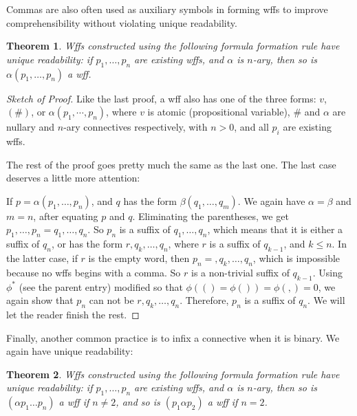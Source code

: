 \documentclass[12pt]{article}
\newtheorem{thm}{Theorem}
\begin{document}
Commas are also often used as auxiliary symbols in forming wffs to improve comprehensibility without violating unique readability.

\begin{thm}  Wffs constructed using the following formula formation rule have unique readability: if $p_1, \ldots, p_n$ are existing wffs, and $\alpha$ is $n$-ary, then so is $\alpha(p_1, \ldots, p_n)$ a wff. \end{thm}

\begin{proof}[Sketch of Proof]  Like the last proof, a wff also has one of the three forms: $v$, $(\#)$, or $\alpha( p_1, \cdots, p_n)$, where $v$ is atomic (propositional variable), $\#$ and $\alpha$ are nullary and $n$-ary connectives respectively, with $n>0$, and all $p_i$ are existing wffs.  

The rest of the proof goes pretty much the same as the last one.  The last case deserves a little more attention:

If $p=\alpha (p_1, \ldots, p_n)$, and $q$ has the form $\beta (q_1, \ldots, q_m)$.  We again have $\alpha = \beta$ and $m=n$, after equating $p$ and $q$.  Eliminating the parentheses, we get $p_1, \ldots, p_n = q_1, \ldots, q_n$.  So $p_n$ is a suffix of $q_1, \ldots, q_n$, which means that it is either a suffix of $q_n$, or has the form $r,q_k,\ldots, q_n$, where $r$ is a suffix of $q_{k-1}$, and $k\le n$.  In the latter case, if $r$ is the empty word, then $p_n = ,q_k,\ldots, q_n$, which is impossible because no wffs begins with a comma.  So $r$ is a non-trivial suffix of $q_{k-1}$.  Using $\phi^*$ (see the parent entry) modified so that $\phi(()=\phi())=\phi(,)=0$, we again show that $p_n$ can not be $r, q_k,\ldots, q_n$.  Therefore, $p_n$ is a suffix of $q_n$.  We will let the reader finish the rest.
\end{proof}

Finally, another common practice is to infix a connective when it is binary.  We again have unique readability:

\begin{thm}  Wffs constructed using the following formula formation rule have unique readability: if $p_1, \ldots, p_n$ are existing wffs, and $\alpha$ is $n$-ary, then so is $(\alpha p_1 \ldots p_n)$ a wff if $n\ne 2$, and so is $(p_1 \alpha p_2)$ a wff if $n=2$.  \end{thm}
\end{document}
